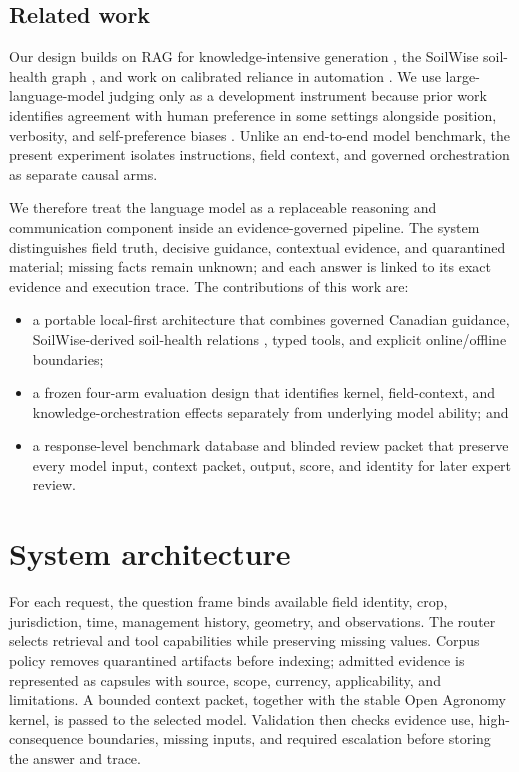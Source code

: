 \documentclass[9pt,twocolumn]{article}
\begin{document}
\subsection{Related work}

Our design builds on RAG for knowledge-intensive generation \citep{lewis2020rag}, the SoilWise soil-health graph \citep{soilwisekg2025}, and work on calibrated reliance in automation \citep{lee2004trust}. We use large-language-model judging only as a development instrument because prior work identifies agreement with human preference in some settings alongside position, verbosity, and self-preference biases \citep{zheng2023judge,wataoka2024selfpreference}. Unlike an end-to-end model benchmark, the present experiment isolates instructions, field context, and governed orchestration as separate causal arms.

We therefore treat the language model as a replaceable reasoning and communication component inside an evidence-governed pipeline. The system distinguishes field truth, decisive guidance, contextual evidence, and quarantined material; missing facts remain unknown; and each answer is linked to its exact evidence and execution trace. The contributions of this work are:

\begin{itemize}
  \item a portable local-first architecture that combines governed Canadian guidance, SoilWise-derived soil-health relations \citep{soilwisekg2025}, typed tools, and explicit online/offline boundaries;
  \item a frozen four-arm evaluation design that identifies kernel, field-context, and knowledge-orchestration effects separately from underlying model ability; and
  \item a response-level benchmark database and blinded review packet that preserve every model input, context packet, output, score, and identity for later expert review.
\end{itemize}

\section{System architecture}

For each request, the question frame binds available field identity, crop, jurisdiction, time, management history, geometry, and observations. The router selects retrieval and tool capabilities while preserving missing values. Corpus policy removes quarantined artifacts before indexing; admitted evidence is represented as capsules with source, scope, currency, applicability, and limitations. A bounded context packet, together with the stable Open Agronomy kernel, is passed to the selected model. Validation then checks evidence use, high-consequence boundaries, missing inputs, and required escalation before storing the answer and trace.
\end{document}
